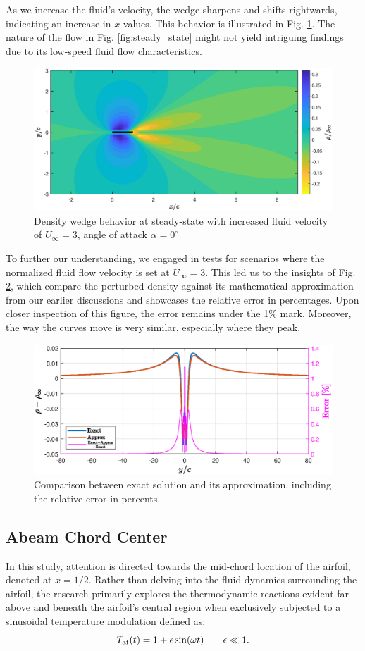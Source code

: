 As we increase the fluid's velocity, the wedge sharpens and shifts rightwards, indicating an increase in $x$-values. This behavior is illustrated in Fig. \ref{fig:steady_state_superSonic}. The nature of the flow in Fig. \ref{fig:steady_state} might not yield intriguing findings due to its low-speed fluid flow characteristics.
\begin{figure}[H]
    \centering
    \includegraphics[width=0.7\linewidth]{drawings/SS_U3_density.eps}
    \caption{
        \footnotesize
        Density wedge behavior at steady-state with increased fluid velocity of $U_\infty = 3$, angle of attack $\alpha=0^{\circ}$}
    \label{fig:steady_state_superSonic}
\end{figure}
To further our understanding, we engaged in tests for scenarios where the normalized fluid flow velocity is set at $U_\infty = 3$. This led us to the insights of Fig. \ref{fig:wedge_analysis}, which compare the perturbed density against its mathematical approximation from our earlier discussions and showcases the relative error in percentages. Upon closer inspection of this figure, the error remains under the 1\% mark. Moreover, the way the curves move is very similar, especially where they peak.
\begin{figure}[H]
    \centering
    \includegraphics[width=0.7\linewidth]{drawings/WA_U3_x5.eps}
    \caption{\footnotesize Comparison between exact solution and its approximation, including the relative error in percents.}
    \label{fig:wedge_analysis}
\end{figure}

\subsection{Abeam Chord Center}
In this study, attention is directed towards the mid-chord location of the airfoil, denoted at $x=1/2$. Rather than delving into the fluid dynamics surrounding the airfoil, the research primarily explores the thermodynamic reactions evident far above and beneath the airfoil's central region when exclusively subjected to a sinusoidal temperature modulation defined as:
\begin{equation}\label{eq:abeam_chord_center_Taf}
    T_{\mathrm{af}} (t)
    =
    1+\epsilon \sin (\omega t)
    \qquad
    \epsilon\ll 1
.
\end{equation}


